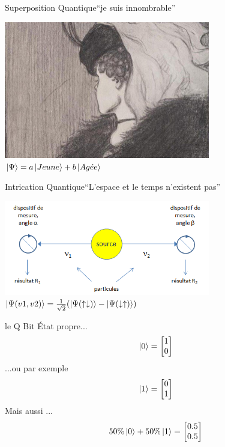 \documentclass{beamer}
\begin{document}
\begin{frame}{Superposition Quantique}{``je suis innombrable''}
  \begin{center}
    \includegraphics[width=9cm]{3604843-inline.jpg}\\
    \vspace{0.5cm}
    $\ket{\Psi} = a \ket{Jeune} + b \ket{Ag\acute{e}e}$ 
  \end{center}
\end{frame}

\begin{frame}{Intrication Quantique}{``L'espace et le temps n'existent pas''}
  \begin{center}
        \includegraphics[width=9cm]{intrication.png}\\
    \vspace{0.5cm}
    $\ket{\Psi(v1, v2)} = \frac{1}{\sqrt{2}}(\ket{\Psi(\uparrow\downarrow)} - \ket{\Psi(\downarrow\uparrow)})$
  \end{center}
\end{frame}

\begin{frame}{le Q Bit}
  \'Etat propre...
  \begin{equation*}
    \ket{0} =
    \begin{bmatrix}
      1 \\
      0 
    \end{bmatrix}
  \end{equation*}
  ...ou par exemple
  \begin{equation*}
    \ket{1} =
    \begin{bmatrix}
      0 \\
      1 
    \end{bmatrix}
  \end{equation*}
    Mais aussi ...
  \begin{equation*}
    50\%\ket{0} + 50\%\ket{1} =
    \begin{bmatrix}
      0.5 \\
      0.5 
    \end{bmatrix}
  \end{equation*}
\end{frame}
\end{document}
